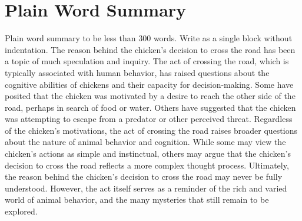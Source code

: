 \documentclass[12 pt]{report}
\begin{document}
\chapter*{Plain Word Summary}
\noindent
Plain word summary to be less than 300 words. Write  as a single block without indentation. The reason behind the chicken's decision to cross the road has been a topic of much speculation and inquiry. The act of crossing the road, which is typically associated with human behavior, has raised questions about the cognitive abilities of chickens and their capacity for decision-making.  Some have posited that the chicken was motivated by a desire to reach the other side of the road, perhaps in search of food or water. Others have suggested that the chicken was attempting to escape from a predator or other perceived threat.  Regardless of the chicken's motivations, the act of crossing the road raises broader questions about the nature of animal behavior and cognition. While some may view the chicken's actions as simple and instinctual, others may argue that the chicken's decision to cross the road reflects a more complex thought process.  Ultimately, the reason behind the chicken's decision to cross the road may never be fully understood. However, the act itself serves as a reminder of the rich and varied world of animal behavior, and the many mysteries that still remain to be explored.
\newpage

\end{document}
